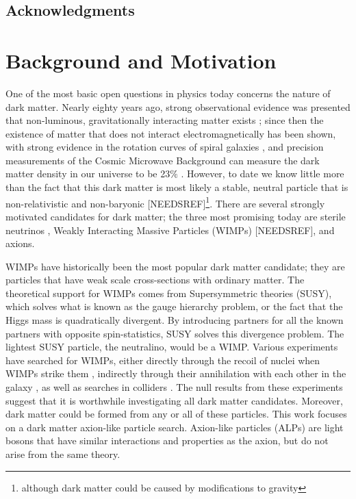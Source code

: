 \documentclass[12pt,twosides]{book}
\begin{document}
\tableofcontents
\section{Acknowledgments}

\chapter{Background and Motivation}


One of the most basic open questions in physics today concerns the nature of dark matter. Nearly eighty years ago, strong observational evidence was presented that non-luminous, gravitationally interacting matter exists \cite{zwicky37}; since then the existence of matter that does not interact electromagnetically has been shown, with strong evidence in the rotation curves of spiral galaxies \cite{rubin80}, and precision measurements of the Cosmic Microwave Background can measure the dark matter density in our universe to be 23$\%$ \cite{planck14}. However, to date we know little more than the fact that this dark matter is most likely a stable, neutral particle that is non-relativistic and non-baryonic [NEEDSREF]\footnote{although dark matter could be caused by modifications to gravity}. There are several strongly motivated candidates for dark matter; the three most promising today are sterile neutrinos \cite{kusenko09}, Weakly Interacting Massive Particles (WIMPs) [NEEDSREF], and axions. 

WIMPs have historically been the most popular dark matter candidate; they are particles that have weak scale cross-sections with ordinary matter. The theoretical support for WIMPs comes from Supersymmetric theories (SUSY), which solves what is known as the gauge hierarchy problem, or the fact that the Higgs mass is quadratically divergent. By introducing partners for all the known partners with opposite spin-statistics, SUSY solves this divergence problem. The lightest SUSY particle, the neutralino, would be a WIMP. Various experiments have searched for WIMPs, either directly through the recoil of nuclei when WIMPs strike them \cite{lux14}, indirectly through their annihilation with each other in the galaxy \cite{slatyer09}, as well as searches in colliders \cite{rajaraman11}. The null results from these experiments suggest that it is worthwhile investigating all dark matter candidates. Moreover, dark matter could be formed from any or all of these particles. This work focuses on a dark matter axion-like particle search. Axion-like particles (ALPs) are light bosons that have similar interactions and properties as the axion, but do not arise from the same theory.
\end{document}
